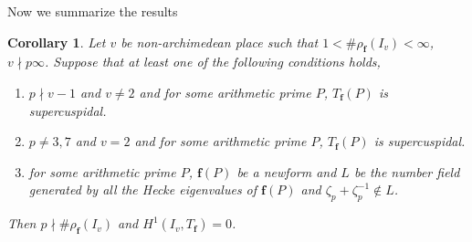 \documentclass[10pt]{amsart}
\numberwithin{equation}{section}
\newtheorem{thm}{Theorem}[section]
\newtheorem{cor}[thm]{Corollary}
\theoremstyle{definition}
\theoremstyle{remark} %
\newcommand{\As}{\operatorname{As}}
\newcommand{\Gal}{\operatorname{Gal}}
\newcommand{\f}{\mathbf{f}}
\newcommand{\g}{\mathbf{g}}
\newcommand{\Q}{\mathbb{Q}}
\begin{document}
	Now we summarize the results
	\begin{cor}
		\label{cor_tam_assump}
		Let $ v $ be non-archimedean place such that $ 1< \#\rho_{\f}(I_v)<\infty $, $ v \nmid p\infty $. Suppose that at least one of the following conditions holds,
		\begin{enumerate}
			\item $ p\nmid v-1 $ and $ v\ne 2 $ and for some arithmetic prime $ P $, $ T_{\f}(P) $ is supercuspidal.
			\item $ p \ne 3,7 $ and $ v=2 $ and for some arithmetic prime $ P $, $ T_{\f}(P) $ is supercuspidal.
			\item for some arithmetic prime $ P $, $ \f(P) $ be a newform and $ L $ be the number field generated by all the Hecke eigenvalues of $ \f(P) $ and $ \zeta_p + \zeta_p^{-1} \notin L $.
		\end{enumerate}
		Then $ p \nmid \#\rho_{\f}(I_v) $ and $ H^1(I_v,T_{\f}) =0 $.
	\end{cor}
	
\end{document}
